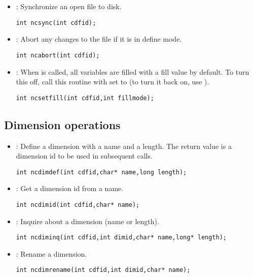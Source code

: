 \begin{itemize}
\item {} : Synchronize an open file to disk. 
\begin{verbatim}
int ncsync(int cdfid);
\end{verbatim}

\item {} : Abort any changes to the file if it is in define mode. 
\begin{verbatim}
int ncabort(int cdfid);
\end{verbatim}

\item {} : When  is called, all variables are
filled with a fill value by default. To turn this off, call this
routine with  set to  (to turn it back
on, use ).
\begin{verbatim}
int ncsetfill(int cdfid,int fillmode);
\end{verbatim}

\end{itemize}

\subsection{Dimension operations}

\begin{itemize}

\item {} : Define a dimension with a name and a length. The
return value is a 
dimension id to be used in subsequent calls.
\begin{verbatim}
int ncdimdef(int cdfid,char* name,long length);
\end{verbatim}

\item {} : Get a dimension id from a name. 
\begin{verbatim}
int ncdimid(int cdfid,char* name);
\end{verbatim}

\item {} : Inquire about a dimension (name or length). 
\begin{verbatim}
int ncdiminq(int cdfid,int dimid,char* name,long* length);
\end{verbatim}

\item {} : Rename a dimension. 
\begin{verbatim}
int ncdimrename(int cdfid,int dimid,char* name);
\end{verbatim}

\end{itemize}

